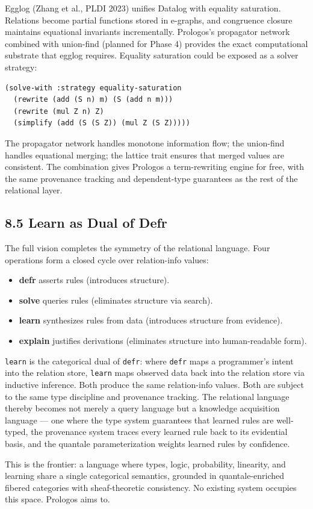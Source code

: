 \documentclass[11pt]{article}
\begin{document}
Egglog (Zhang et al., PLDI 2023) unifies Datalog with equality saturation. Relations become partial functions stored in e-graphs, and congruence closure maintains equational invariants incrementally. Prologos's propagator network combined with union-find (planned for Phase 4) provides the exact computational substrate that egglog requires. Equality saturation could be exposed as a solver strategy:

\begin{verbatim}
(solve-with :strategy equality-saturation
  (rewrite (add (S n) m) (S (add n m)))
  (rewrite (mul Z n) Z)
  (simplify (add (S (S Z)) (mul Z (S Z)))))
\end{verbatim}

The propagator network handles monotone information flow; the union-find handles equational merging; the lattice trait ensures that merged values are consistent. The combination gives Prologos a term-rewriting engine for free, with the same provenance tracking and dependent-type guarantees as the rest of the relational layer.
\subsection{8.5 Learn as Dual of Defr}
\label{sec:org9ac5f24}

The full vision completes the symmetry of the relational language. Four operations form a closed cycle over relation-info values:

\begin{itemize}
\item \textbf{defr} asserts rules (introduces structure).
\item \textbf{solve} queries rules (eliminates structure via search).
\item \textbf{learn} synthesizes rules from data (introduces structure from evidence).
\item \textbf{explain} justifies derivations (eliminates structure into human-readable form).
\end{itemize}

\texttt{learn} is the categorical dual of \texttt{defr}: where \texttt{defr} maps a programmer's intent into the relation store, \texttt{learn} maps observed data back into the relation store via inductive inference. Both produce the same relation-info values. Both are subject to the same type discipline and provenance tracking. The relational language thereby becomes not merely a query language but a knowledge acquisition language --- one where the type system guarantees that learned rules are well-typed, the provenance system traces every learned rule back to its evidential basis, and the quantale parameterization weights learned rules by confidence.

This is the frontier: a language where types, logic, probability, linearity, and learning share a single categorical semantics, grounded in quantale-enriched fibered categories with sheaf-theoretic consistency. No existing system occupies this space. Prologos aims to.
\end{document}
